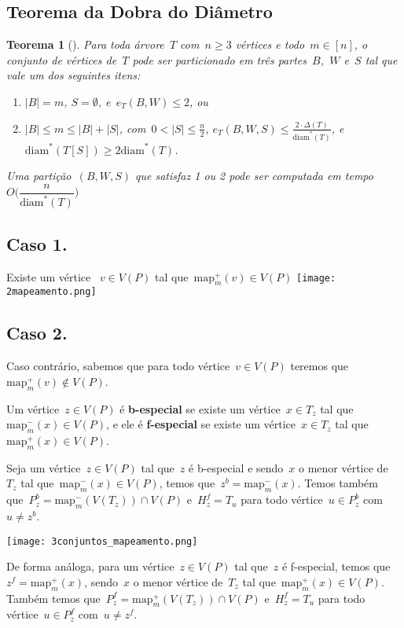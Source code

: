 \documentclass[a0,portrait]{a0poster}
\newtheorem{teo}{Teorema}
\newcommand{\diam}{\mathrm{diam}}
\newcommand{\map}{\mathrm{map}}
\begin{document}
\begin{multicols}{3}
\section*{Teorema da Dobra do Diâmetro}
\begin{teo}[]
    Para toda árvore~$T$ com~${n\ge 3}$ vértices e 
    todo~${m\in [n]}$,
    o conjunto de vértices de~$T$ pode ser particionado em 
    três partes~$B$,~$W$ e~$S$ tal que vale um dos 
    seguintes itens:
    \begin{enumerate}
    \item ${|B|=m}$, ${S=\emptyset}$, e~${e_T(B,W)\le 2}$, ou
    \item ${|B|\le m\le |B|+|S|}$, 
    com~${0<|S|\le\frac{n}{2}}$,
    ${e_T(B,W,S)\le \frac{2\cdot 
    \Delta(T)}{\diam^*(T)}}$, 
    e~${\diam^*(T[S])\ge 2\diam^*(T)}$.
    \end{enumerate}
    Uma partição~$(B,W,S)$ que satisfaz 1 ou 2 pode ser
    computada em tempo~${O\Big(\dfrac{n}{\diam^*(T)}\Big)}$ 
\end{teo}


\subsection*{Caso 1.}
Existe um vértice ~${v\in V(P)}$ tal 
que~${\map_m^+(v)\in V(P)}$
\texttt{[image: 2mapeamento.png]}

\subsection*{Caso 2.}
Caso contrário, sabemos que para todo vértice~${v\in V(P)}$
teremos que~${\map_m^+(v)\not\in V(P)}$.

Um vértice~${z\in V(P)}$ é \textbf{b-especial}
se existe um vértice~${x\in T_z}$ tal 
que~${\map^{-}_m(x)\in V(P)}$, e ele é
\textbf{f-especial} se existe um vértice~${x\in T_z}$
tal que~${\map^{+}_m(x)\in V(P)}$.

\bigskip
\bigskip
    
Seja um vértice~${z\in V(P)}$ tal que~$z$ é b-especial e
sendo~$x$ o menor vértice de~$T_z$ tal 
que~${\map^-_m(x)\in V(P)}$, temos 
que~${z^b = \map^-_m(x)}$.
Temos também
que~${P_z^b = \map^-_m(V(T_z))\cap V(P)}$
e~${H_z^f =T_u}$ para todo 
vértice~${u\in P_z^b}$ com~${u\ne z^b}$.
            
\texttt{[image: 3conjuntos\_mapeamento.png]}

\bigskip
\bigskip

De forma análoga, para um vértice~${z\in V(P)}$ tal 
que~$z$ é f-especial,
temos que~${z^f = \map^+_m(x)}$,
sendo~$x$ o menor vértice de~$T_z$ tal 
que~${\map^+_m(x)\in V(P)}$.
Também temos
que~${P_z^f = \map^+_m(V(T_z))\cap V(P)}$
e~${H_z^f =T_u}$ para todo 
vértice~${u\in P_z^f}$ com~${u\ne z^f}$.



\end{multicols}
\end{document}
